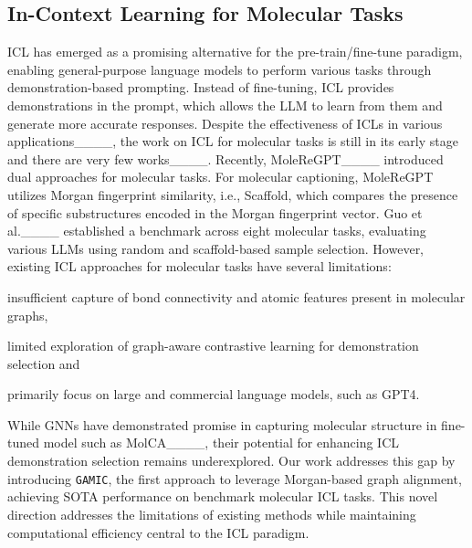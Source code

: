 \subsection{In-Context Learning for Molecular Tasks}
ICL has emerged as a promising alternative for the pre-train/fine-tune paradigm, enabling general-purpose language models to perform various tasks through demonstration-based prompting. Instead of fine-tuning, ICL provides demonstrations in the prompt, which allows the LLM to learn from them and generate more accurate responses.   
Despite the effectiveness of ICLs in various applications____, the work on ICL for molecular tasks is still in its early stage and there are very few works____. %
Recently, MoleReGPT____ introduced dual approaches for molecular tasks. For molecular captioning, MoleReGPT utilizes Morgan fingerprint similarity, i.e., Scaffold, which compares the presence of specific substructures encoded in the Morgan fingerprint vector. %
Guo et al.____ established a benchmark across eight molecular tasks, evaluating various LLMs using random and scaffold-based sample selection. However, existing ICL approaches for molecular tasks have several limitations:
\begin{inparaenum}[(a)]
    \item insufficient capture of bond connectivity and atomic features present in molecular graphs,
    \item limited exploration of graph-aware contrastive learning for demonstration selection and
    \item primarily focus on large and commercial language models, such as GPT4.
\end{inparaenum}

While GNNs have demonstrated promise in capturing molecular structure in fine-tuned model such as  MolCA____, their potential for enhancing ICL demonstration selection remains underexplored. Our work addresses this gap by introducing \texttt{GAMIC}, the first approach to leverage Morgan-based graph alignment, achieving SOTA performance on benchmark molecular ICL tasks. This novel direction addresses the limitations of existing methods while maintaining computational efficiency central to the ICL paradigm.

